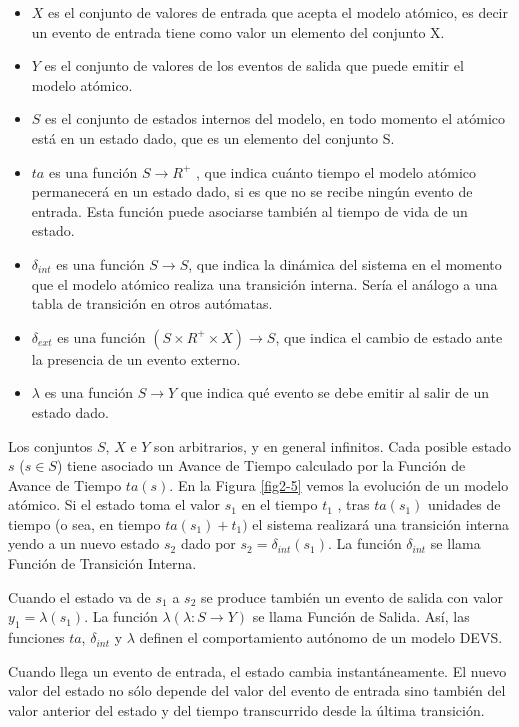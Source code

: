 \documentclass[a4paper,	11pt]{report}
\begin{document}
\begin{itemize}
\item $X$ es el conjunto de valores de entrada que acepta el modelo atómico, es decir un evento de entrada tiene como valor un elemento del conjunto X.
\item $Y$ es el conjunto de valores de los eventos de salida que puede emitir el modelo atómico.
\item $S$ es el conjunto de estados internos del modelo, en todo momento el atómico está en un estado dado, que es un elemento del conjunto S.
\item $ta$ es una función $S \to R^{+}$ , que indica cuánto tiempo el modelo atómico permanecerá en un estado dado, si es que no se recibe ningún evento de entrada. Esta función puede asociarse también al tiempo de vida de un estado.
\item $\delta_{int}$ es una función $S \to S$, que indica la dinámica del sistema en el momento que el modelo atómico realiza una transición interna. Sería el análogo a una tabla de transición en otros autómatas.
\item $\delta_{ext}$ es una función $(S \times R^{+} \times X) \to S$, que indica el cambio de estado ante la presencia de un evento externo.
\item $\lambda$ es una función $S \to Y$ que indica qué evento se debe emitir al salir de un estado dado.
\end{itemize}

Los conjuntos $S$, $X$ e $Y$ son arbitrarios, y en general infinitos. Cada posible estado $s$ ($s \in S$) tiene asociado un Avance de Tiempo calculado por la Función de Avance de Tiempo $ta(s)$.
En la Figura \ref{fig2-5} vemos la evolución de un modelo atómico. Si el estado toma el valor $s_1$ en el tiempo $t_1$ , tras $ta(s_1)$ unidades de tiempo (o sea, en tiempo $ta(s_1 ) + t_1 )$ el sistema realizará una transición interna yendo a un nuevo estado $s_2$ dado por $s_2 = \delta_{int} (s_1 )$. La función $\delta_{int}$ se llama Función de Transición Interna.

Cuando el estado va de $s_1$ a $s_2$ se produce también un evento de salida con valor $y_1 = \lambda(s_1)$. La función $\lambda (\lambda : S \to Y )$ se llama Función de Salida. Así, las funciones $ta$, $\delta_{int}$ y $\lambda$ definen el comportamiento autónomo de un modelo DEVS.

Cuando llega un evento de entrada, el estado cambia instantáneamente. El nuevo valor del estado no sólo depende del valor del evento de entrada sino también del valor anterior del estado y del tiempo transcurrido desde la última transición.
\end{document}
